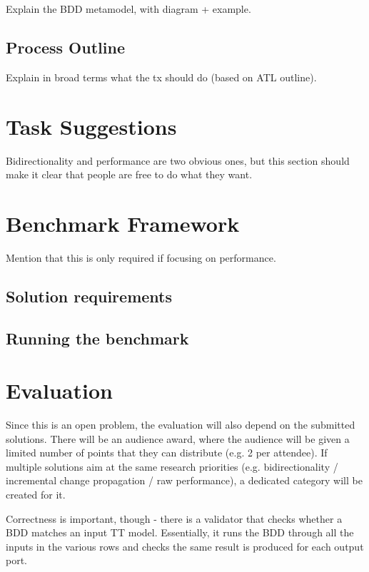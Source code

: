 \documentclass[a4paper]{scrartcl}
\begin{document}
Explain the BDD metamodel, with diagram + example.

\subsection{Process Outline}
\label{sec:process-outline}

Explain in broad terms what the tx should do (based on ATL outline).

\section{Task Suggestions}
\label{sec:task-suggestions}

Bidirectionality and performance are two obvious ones, but this section should
make it clear that people are free to do what they want.

\section{Benchmark Framework}
\label{sec:benchmark-framework}

Mention that this is only required if focusing on performance.

\subsection{Solution requirements}
\label{sec:solut-requ}

\subsection{Running the benchmark}
\label{sec:running-benchmark}

\section{Evaluation}
\label{sec:evaluation}

Since this is an open problem, the evaluation will also depend on the submitted
solutions. There will be an audience award, where the audience will be given a
limited number of points that they can distribute (e.g. 2 per attendee). If
multiple solutions aim at the same research priorities (e.g. bidirectionality /
incremental change propagation / raw performance), a dedicated category will be
created for it.

Correctness is important, though - there is a validator that checks whether a
BDD matches an input TT model. Essentially, it runs the BDD through all the
inputs in the various rows and checks the same result is produced for each
output port.
\end{document}
